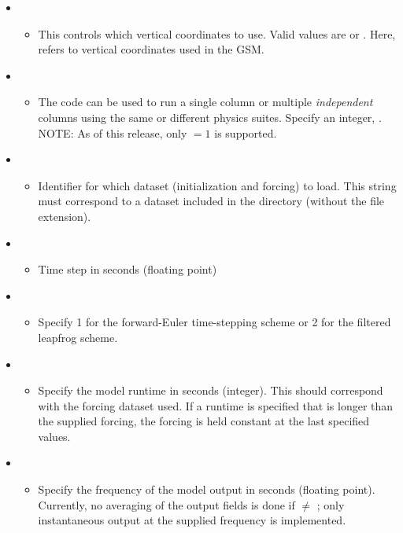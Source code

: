 \begin{itemize}
\item {}
	\begin{itemize}
	\item This controls which vertical coordinates to use. Valid values are  or . Here,  refers to vertical coordinates used in the GSM.
	\end{itemize}
\item {}
	\begin{itemize}
	\item The code can be used to run a single column or multiple \emph{independent} columns using the same or different physics suites. Specify an integer, . NOTE: As of this release, only  $= 1$ is supported.
	\end{itemize}
\item {}
	\begin{itemize}
	\item Identifier for which dataset (initialization and forcing) to load. This string must correspond to a dataset included in the directory  (without the file extension).
	\end{itemize}
\item {}
	\begin{itemize}
	\item Time step in seconds (floating point)
	\end{itemize}
\item {}
	\begin{itemize}
	\item Specify 1 for the forward-Euler time-stepping scheme or 2 for the filtered leapfrog scheme.
	\end{itemize}
\item {}
	\begin{itemize}
	\item Specify the model runtime in seconds (integer). This should correspond with the forcing dataset used. If a runtime is specified that is longer than the supplied forcing, the forcing is held constant at the last specified values.
	\end{itemize}
\item {}
	\begin{itemize}
	\item Specify the frequency of the model output in seconds (floating point). Currently, no averaging of the output fields is done if  $\neq$ ; only instantaneous output at the supplied frequency is implemented.

\end{itemize}
\end{itemize}
